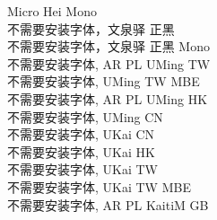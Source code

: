 \documentclass[12pt,a4paper]{article}
\begin{document}
 \par
{
Micro Hei Mono%
\\}
{
不需要安装字体，文泉驿 正黑 \\}
{
不需要安装字体，文泉驿 正黑 Mono \\}
{
不需要安装字体, AR PL UMing TW \\}
{
不需要安装字体, UMing TW MBE \\}
{
不需要安装字体, AR PL UMing HK \\}
{
不需要安装字体, UMing CN\\}
{
不需要安装字体, UKai CN \\}
{
不需要安装字体, UKai HK \\}
{
不需要安装字体, UKai TW \\}
{
不需要安装字体, UKai TW MBE \\}
{
不需要安装字体, AR PL KaitiM GB \\}
\end{document}
